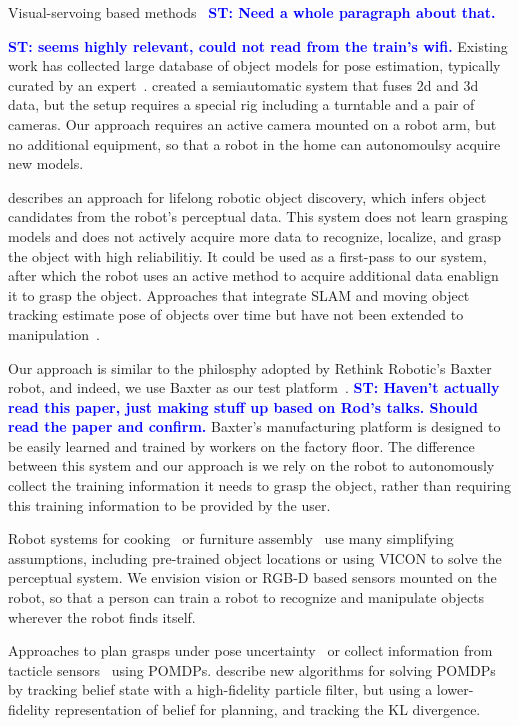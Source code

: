 \documentclass{article}
\newcommand{\stnote}[1]{\textcolor{blue}{\textbf{ST: #1}}}
\begin{document}
Visual-servoing based methods~\citep{chaumette06} \stnote{Need a whole
  paragraph about that. }

\stnote{\citet{ciocarlie14} seems highly relevant, could not read from
  the train's wifi.}  Existing work has collected large database of
object models for pose estimation, typically curated by an
expert~\citep{lai11}.  \citet{kasper12} created a semiautomatic system
that fuses 2d and 3d data, but the setup requires a special rig
including a turntable and a pair of cameras.  Our approach requires an
active camera mounted on a robot arm, but no additional equipment, so
that a robot in the home can autonomoulsy acquire new models.

\citet{collect14} describes an approach for lifelong robotic object
discovery, which infers object candidates from the robot's perceptual
data.  This system does not learn grasping models and does not
actively acquire more data to recognize, localize, and grasp the
object with high reliabilitiy.  It could be used as a first-pass to
our system, after which the robot uses an active method to acquire
additional data enablign it to grasp the object.  Approaches that
integrate SLAM and moving object tracking estimate pose of objects
over time but have not been extended to manipulation~\citep{wang07,
  gallagher09, salas-moreno13, selvatici08}.

Our approach is similar to the philosphy adopted by Rethink Robotic's
Baxter robot, and indeed, we use Baxter as our test
platform~\citep{fitzgerald13}.  \stnote{Haven't actually read this
  paper, just making stuff up based on Rod's talks.  Should read the
  paper and confirm.}  Baxter's manufacturing platform is designed to
be easily learned and trained by workers on the factory floor.  The
difference between this system and our approach is we rely on the
robot to autonomously collect the training information it needs to
grasp the object, rather than requiring this training information to
be provided by the user.


Robot systems for cooking~\citep{bollini12, beetz11} or furniture
assembly~\citep{knepper13} use many simplifying assumptions, including
pre-trained object locations or using VICON to solve the perceptual
system.  We envision vision or RGB-D based sensors mounted on the
robot, so that a person can train a robot to recognize and manipulate
objects wherever the robot finds itself.

Approaches to plan grasps under pose uncertainty~\citep{stulp11} or
collect information from tacticle sensors~\citep{hsiao10} using
POMDPs.  \citet{plat11} describe new algorithms for solving POMDPs by
tracking belief state with a high-fidelity particle filter, but using
a lower-fidelity representation of belief for planning, and tracking
the KL divergence.
\end{document}
